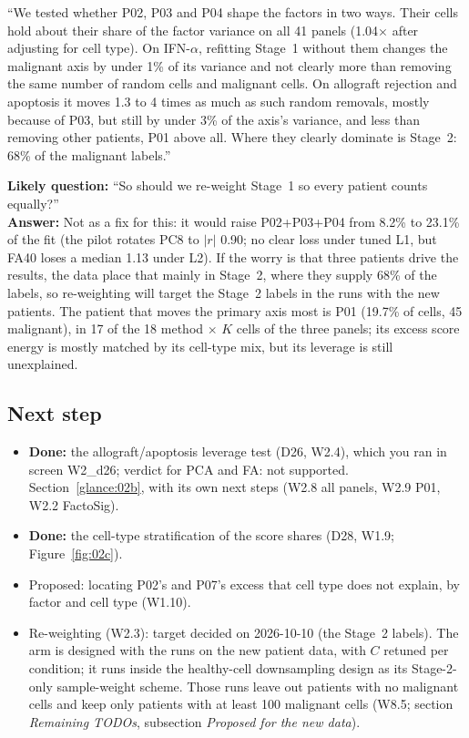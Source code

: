 \begin{teambox}
``We tested whether P02, P03 and P04 shape the factors in two ways. Their cells hold about their share of the factor variance on all 41 panels (1.04$\times$ after adjusting for cell type). On IFN-$\alpha$, refitting Stage~1 without them changes the malignant axis by under 1\% of its variance and not clearly more than removing the same number of random cells and malignant cells. On allograft rejection and apoptosis it moves 1.3 to 4 times as much as such random removals, mostly because of P03, but still by under 3\% of the axis's variance, and less than removing other patients, P01 above all. Where they clearly dominate is Stage~2: 68\% of the malignant labels.''

\textbf{Likely question:} ``So should we re-weight Stage~1 so every patient counts equally?''\\
\textbf{Answer:} Not as a fix for this: it would raise P02+P03+P04 from 8.2\% to 23.1\% of the fit (the pilot rotates PC8 to $|r|$ 0.90; no clear loss under tuned L1, but FA40 loses a median 1.13\pp{} under L2). If the worry is that three patients drive the results, the data place that mainly in Stage~2, where they supply 68\% of the labels, so re-weighting will target the Stage~2 labels in the runs with the new patients. The patient that moves the primary axis most is P01 (19.7\% of cells, 45 malignant), in 17 of the 18 method $\times$ $K$ cells of the three panels; its excess score energy is mostly matched by its cell-type mix, but its leverage is still unexplained.
\end{teambox}

\subsection*{Next step}
\begin{itemize}
\item \textbf{Done:} the allograft/apoptosis leverage test (D26, W2.4), which you ran in screen W2\_d26; verdict for PCA and FA: not supported. Section~\ref{glance:02b}, with its own next steps (W2.8 all panels, W2.9 P01, W2.2 FactoSig).
\item \textbf{Done:} the cell-type stratification of the score shares (D28, W1.9; Figure~\ref{fig:02c}).
\item Proposed: locating P02's and P07's excess that cell type does not explain, by factor and cell type (W1.10).
\item Re-weighting (W2.3): target decided on 2026-10-10 (the Stage~2 labels). The arm is designed with the runs on the new patient data, with $C$ retuned per condition; it runs inside the healthy-cell downsampling design as its Stage-2-only sample-weight scheme. Those runs leave out patients with no malignant cells and keep only patients with at least 100 malignant cells (W8.5; section \emph{Remaining TODOs}, subsection \emph{Proposed for the new data}). 
\end{itemize}

